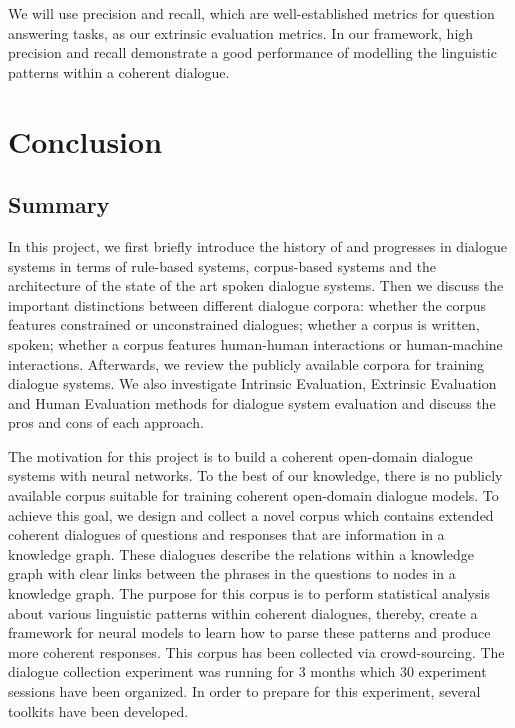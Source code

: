 \documentclass[bsc,frontabs,twoside,singlespacing,parskip,deptreport]{infthesis}     %
\begin{document}
We will use precision and recall, which are well-established metrics for question answering tasks, as our extrinsic evaluation metrics. In our framework, high precision and recall demonstrate a good performance of modelling the linguistic patterns within a coherent dialogue.





\chapter{Conclusion}


\section{Summary}

In this project, we first briefly introduce the history of and progresses in dialogue systems in terms of rule-based systems, corpus-based systems and the architecture of the state of the art spoken dialogue systems. Then we discuss the important distinctions between different dialogue corpora: whether the corpus features constrained or unconstrained dialogues; whether a corpus is written, spoken; whether a corpus features human-human interactions or human-machine interactions. Afterwards, we review the publicly available corpora for training dialogue systems. We also investigate Intrinsic Evaluation, Extrinsic Evaluation and Human Evaluation methods for dialogue system evaluation and discuss the pros and cons of each approach.

The motivation for this project is to build a coherent open-domain dialogue systems with neural networks. To the best of our knowledge, there is no publicly available corpus suitable for training coherent open-domain dialogue models. To achieve this goal, we design and collect a novel corpus which contains extended coherent dialogues of questions and responses that are information in a knowledge graph. These dialogues describe the relations within a knowledge graph with clear links between the phrases in the questions to nodes in a knowledge graph. The purpose for this corpus is to perform statistical analysis about various linguistic patterns within coherent dialogues, thereby, create a framework for neural models to learn how to parse these patterns and produce more coherent responses. This corpus has been collected via crowd-sourcing. The dialogue collection experiment was running for 3 months which 30 experiment sessions have been organized. In order to prepare for this experiment, several toolkits have been developed.
\end{document}
